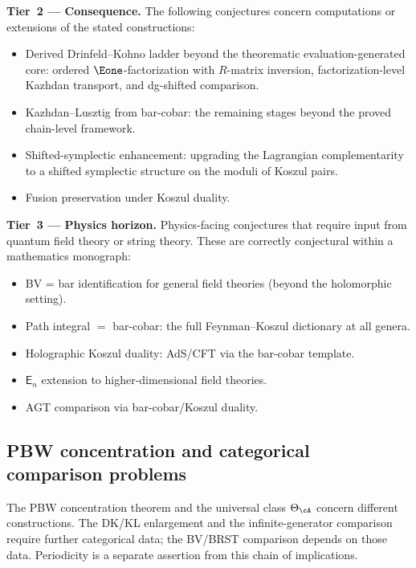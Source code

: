 \smallskip\noindent\textbf{Tier~2 --- Consequence.}
The following conjectures concern computations or extensions of the stated constructions:
\begin{itemize}
\item Derived Drinfeld--Kohno ladder beyond the theorematic
  evaluation-generated core:
  ordered $\Eone$-factorization with $R$-matrix inversion,
  factorization-level Kazhdan transport, and dg-shifted comparison.
\item Kazhdan--Lusztig from bar-cobar: the remaining stages
  beyond the proved chain-level framework.
\item Shifted-symplectic enhancement: upgrading the Lagrangian
  complementarity to a shifted symplectic structure on the
  moduli of Koszul pairs.
\item Fusion preservation under Koszul duality.
\end{itemize}

\smallskip\noindent\textbf{Tier~3 --- Physics horizon.}
Physics-facing conjectures that require input from quantum field
theory or string theory.  These are correctly conjectural within
a mathematics monograph:
\begin{itemize}
\item BV = bar identification for general field theories
  (beyond the holomorphic setting).
\item Path integral $=$ bar-cobar: the full Feynman--Koszul
  dictionary at all genera.
\item Holographic Koszul duality: AdS/CFT via the bar-cobar template.
\item $\mathsf{E}_n$ extension to higher-dimensional field theories.
\item AGT comparison via bar-cobar/Koszul duality.
\end{itemize}

\subsection{PBW concentration and categorical comparison problems}
\label{subsec:five-master-conjectures}

The PBW concentration theorem and the universal class $\Theta_\cA$ concern
different constructions.  The DK/KL enlargement and the infinite-generator comparison
require further categorical data; the BV/BRST comparison depends on those data.
Periodicity is a separate assertion from this chain of implications.

